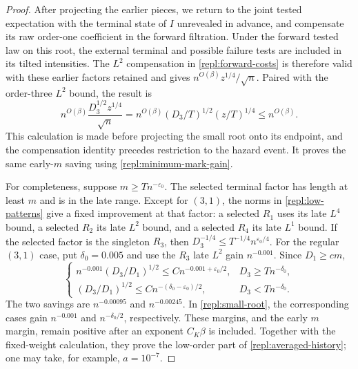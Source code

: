 \begin{proof}
After projecting the earlier pieces, we return to the joint tested
expectation with the terminal state of $I$ unrevealed in advance, and
compensate its raw order-one coefficient in the forward filtration.
Under the forward tested law on this root, the external terminal and
possible failure tests are included in its tilted intensities.
The $L^2$ compensation in \eqref{repl:forward-costs} is therefore valid
with these earlier factors retained and gives
$n^{O(\beta)}z^{1/4}/\sqrt n$.  Paired with the order-three $L^2$ bound,
the result is
\begin{equation}\label{repl:small-root}
 n^{O(\beta)}\frac{D_3^{1/2}z^{1/4}}{\sqrt n}
 =n^{O(\beta)}(D_3/T)^{1/2}(z/T)^{1/4}
 \le n^{O(\beta)}.
\end{equation}
This calculation is made before projecting the small root onto its
endpoint, and the compensation identity precedes restriction to the
hazard event.  It proves the same early-$m$ saving using
\eqref{repl:minimum-mark-gain}.

For completeness, suppose $m\ge Tn^{-\varepsilon_0}$.  The selected terminal
factor has length at least $m$ and is in the late range.  Except for $(3,1)$,
the norms in \eqref{repl:low-patterns} give a fixed improvement at that
factor: a selected $R_1$ uses its late $L^4$ bound, a selected $R_2$ its late
$L^2$ bound, and a selected $R_4$ its late $L^1$ bound.
If the selected factor is the singleton $R_3$, then
$D_3^{-1/4}\le T^{-1/4}n^{\varepsilon_0/4}$.
For the regular $(3,1)$ case, put $\delta_0=0.005$ and use the
$R_3$ late $L^2$ gain $n^{-0.001}$.  Since $D_1\ge cm$,
\[
 \begin{cases}
 n^{-0.001}(D_3/D_1)^{1/2}
       \le C n^{-0.001+\varepsilon_0/2},
       &D_3\ge Tn^{-\delta_0},\\
 (D_3/D_1)^{1/2}
       \le C n^{-(\delta_0-\varepsilon_0)/2},
       &D_3<Tn^{-\delta_0}.
 \end{cases}
\]
The two savings are $n^{-0.00095}$ and $n^{-0.00245}$.
In \eqref{repl:small-root}, the corresponding cases gain $n^{-0.001}$
and $n^{-\delta_0/2}$, respectively.  These margins, and the early
$m$ margin, remain positive after an exponent $C_K\beta$ is included.
Together with the fixed-weight calculation, they prove the low-order
part of \eqref{repl:averaged-history}; one may take, for example,
$a=10^{-7}$.


\end{proof}
